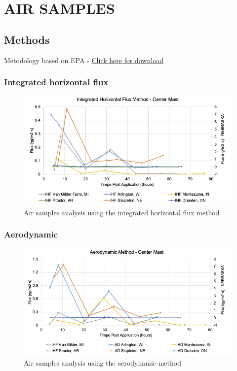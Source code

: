 \documentclass[]{article}
\begin{document}
\pagebreak
\newpage

\section{AIR SAMPLES}\label{air-samples}

\subsection{Methods}\label{methods}

Metodology based on EPA -
\href{https://www.epa.gov/sites/production/files/2015-08/documents/ftt_add_guidance_reviewing_env_fate_studies.pdf}{Click
here for download}

\pagebreak
\newpage

\subsubsection{Integrated horizontal
flux}\label{integrated-horizontal-flux}

\begin{figure}[h]

{\centering \includegraphics[width=1\linewidth]{Airsample} 

}

\caption{Air samples analysis using the integrated horizontal flux method}\label{fig:unnamed-chunk-114}
\end{figure}

\pagebreak
\newpage

\subsubsection{Aerodynamic}\label{aerodynamic}

\begin{figure}[h]

{\centering \includegraphics[width=1\linewidth]{Airsample2} 

}

\caption{Air samples analysis using the aerodynamic method}\label{fig:unnamed-chunk-115}
\end{figure}
\end{document}
